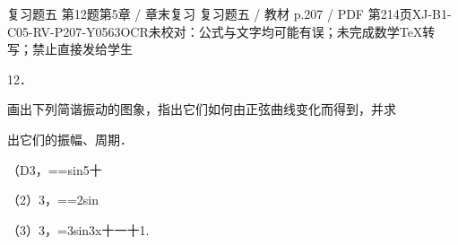 \begin{bankitem}{复习题五 第12题}{第5章 / 章末复习 复习题五 / 教材 p.207 / PDF 第214页}{XJ-B1-C05-RV-P207-Y0563}{OCR未校对：公式与文字均可能有误；未完成数学TeX转写；禁止直接发给学生}
\begin{ocrdraft}
\par
12．
\par
画出下列简谐振动的图象，指出它们如何由正弦曲线变化而得到，并求
\par
出它们的振幅、周期．
\par
（D3，==sin5十
\par
（2）3，==2sin
\par
（3）3，=3sin3x十一十1.
\end{ocrdraft}
\end{bankitem}
